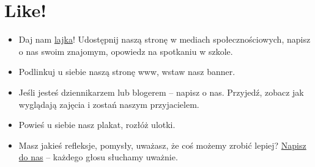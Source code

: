 \documentclass[a4paper]{article}
\begin{document}
\section{Like!}
\begin{itemize}
\item Daj nam \href{https://www.facebook.com/CoderDojoPL/}{lajka}! Udostępnij naszą stronę w mediach społecznościowych, napisz o nas swoim znajomym, opowiedz na spotkaniu w szkole. 
\item Podlinkuj u siebie naszą stronę www, wstaw nasz banner. 
\item Jeśli jesteś dziennikarzem lub blogerem – napisz o nas. Przyjedź, zobacz jak wyglądają zajęcia i zostań naszym przyjacielem. 
\item Powieś u siebie nasz plakat, rozłóż ulotki. 
\item Masz jakieś refleksje, pomysły, uważasz, że coś możemy zrobić lepiej? \href{mailto:dojo@coderdojo.org.pl}{Napisz do nas} – każdego głosu słuchamy uważnie.
\end{itemize}
\end{document}
